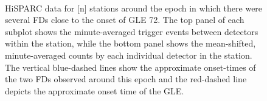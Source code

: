 \begin{figure}[ht]
	\centering
	 \\
	
	\qquad
	
	
	\caption{HiSPARC data for [n] stations around the epoch in which there were several FDs close to the onset of GLE 72. The top panel of each subplot shows the minute-averaged trigger events between detectors within the station, while the bottom panel shows the mean-shifted, minute-averaged counts by each individual detector in the station. The vertical blue-dashed lines show the approximate onset-times of the two FDs observed around this epoch and the red-dashed line depicts the approximate onset time of the GLE.}
	\label{fig:FD_GLE72}
\end{figure}

